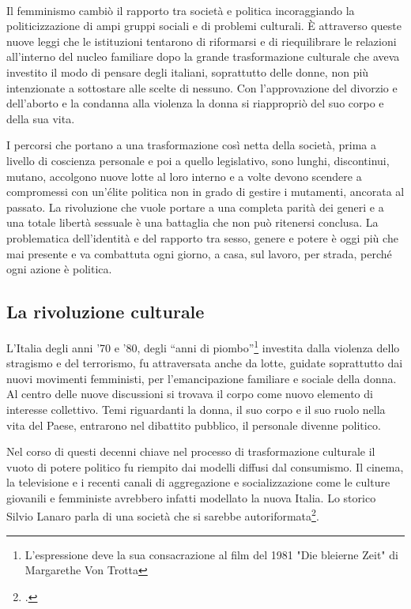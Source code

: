 \paragraph{}Il femminismo cambiò il rapporto tra società e politica incoraggiando la politicizzazione di ampi gruppi sociali e di problemi culturali.
È attraverso queste nuove leggi che le istituzioni tentarono di riformarsi e di riequilibrare le relazioni all'interno del nucleo familiare dopo la grande trasformazione culturale che aveva investito il modo di pensare degli italiani, soprattutto delle donne, non più intenzionate a sottostare alle scelte di nessuno.
Con l'approvazione del divorzio e dell'aborto e la condanna alla violenza la donna si riappropriò del suo corpo e della sua vita.

I percorsi che portano a una trasformazione così netta della società, prima a livello di coscienza personale e poi a quello legislativo, sono lunghi, discontinui, mutano, accolgono nuove lotte al loro interno e a volte devono scendere a compromessi con un'élite politica non in grado di gestire i mutamenti, ancorata al passato.
La rivoluzione che vuole portare a una completa parità dei generi e a una totale libertà sessuale è una battaglia che non può ritenersi conclusa.
La problematica dell'identità e del rapporto tra sesso, genere e potere è oggi più che mai presente e va combattuta ogni giorno, a casa, sul lavoro, per strada, perché ogni azione è politica. 




\subsection{ La rivoluzione culturale }
L'Italia degli anni '70 e '80, degli \enquote{anni di piombo}\footnote{L'espressione deve la sua consacrazione al film del 1981 "Die bleierne Zeit" di Margarethe Von Trotta} investita dalla violenza dello stragismo e del terrorismo, fu attraversata anche da lotte, guidate soprattutto dai nuovi movimenti femministi, per l'emancipazione familiare e sociale della donna.
\\Al centro delle nuove discussioni si trovava il corpo come nuovo elemento di interesse collettivo.
Temi riguardanti la donna, il suo corpo e il suo ruolo nella vita del Paese, entrarono nel dibattito pubblico, il personale divenne politico.


Nel corso di questi decenni chiave nel processo di trasformazione culturale il vuoto di potere politico fu riempito dai modelli diffusi dal consumismo.
Il cinema, la televisione e i recenti canali di aggregazione e socializzazione come le culture giovanili e femministe avrebbero infatti modellato la nuova Italia.
Lo storico Silvio Lanaro parla di una società che si sarebbe autoriformata\footcite{Balestracci2}.


